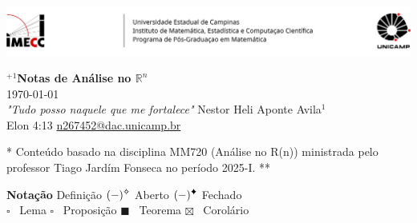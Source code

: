 \documentclass[a4paper, 17pt]{extarticle}
\begin{document}
\setlength{\columnsep}{1in}


\-\vspace{-1.3cm} 

\par\noindent \includegraphics[width = \linewidth]{Imagens/Header.png} 


\begin{center} %
{%
 \LARGE \textbf{\(^{+1}\)Notas de Análise no \(\mathbb{R}^n\)}} \vspace{0.1in}   \\
 { \today }\\ 
 {\small
 \vspace{0.4cm}\emph{"Tudo posso naquele que me fortalece" }\hfill Nestor Heli Aponte Avila\(^{1}\) \\ 
  
Elon 4:13 \hfill \href{mailto:n267452@dac.unicamp.br}{\url{n267452@dac.unicamp.br}}} %
\end{center} %
\- \vspace{-1cm}

{\small ** Conteúdo basado na disciplina MM720 (Análise no R(n)) ministrada pelo professor Tiago Jardím Fonseca no período 2025-I. **\vspace{0.3cm}}%


{\large \textbf{Notação}} \hfill {}  Definição \hfill \((-)^{\text{\ding{71}}}\)  Aberto \hfill  \((-)^{\text{\ding{70}}}\) Fechado \\ 
{\scriptsize$\square$} \ Lema \hspace{2.4cm} {\large$\square$} \ Proposição \hspace{1.5cm}  {\large $\blacksquare$}  \ Teorema \hspace{2cm} {\scriptsize $\boxtimes$}  \ Corolário
\end{document}
